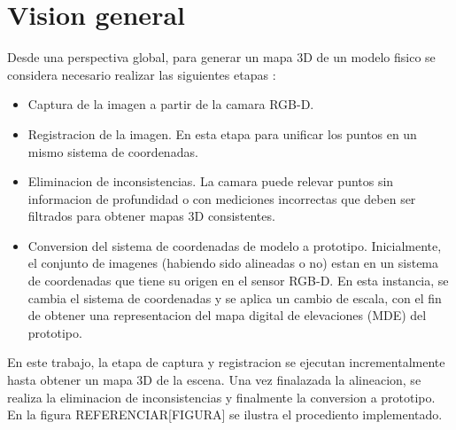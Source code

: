 \chapter{Vision general}

Desde una perspectiva global, para generar un mapa 3D de un modelo fisico se considera necesario realizar las siguientes etapas :
\begin{itemize}

\item Captura de la imagen a partir de la camara RGB-D.

\item Registracion de la imagen. En esta etapa para unificar los puntos en un mismo sistema de coordenadas.

\item Eliminacion de inconsistencias. La camara puede relevar puntos sin informacion de profundidad o con mediciones incorrectas que deben ser filtrados para obtener mapas 3D consistentes. 

\item Conversion del sistema de coordenadas de modelo a prototipo. Inicialmente, el conjunto de imagenes (habiendo sido alineadas o no) estan en un sistema de coordenadas que tiene su origen en el sensor RGB-D. En esta instancia, se cambia el sistema de coordenadas y se aplica un cambio de escala, con el fin de obtener una representacion del mapa digital de elevaciones (MDE) del prototipo.

\end{itemize}

En este trabajo, la etapa de captura y registracion se ejecutan incrementalmente hasta obtener un mapa 3D de la escena. Una vez finalazada la alineacion, se realiza la eliminacion de inconsistencias y finalmente la conversion a prototipo. En la figura REFERENCIAR[FIGURA] se ilustra el procediento implementado.

